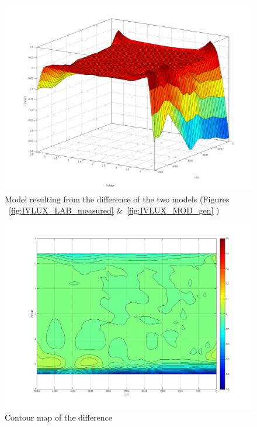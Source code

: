 \begin{figure}[H]
  \begin{center}
	  \includegraphics[width=\textwidth]{images/Diff_Contour}
	  \caption{Model resulting from the difference of the two models (Figures ~\ref{fig:IVLUX_LAB_measured} \&~\ref{fig:IVLUX_MOD_gen} )  }
	  \label{fig:Diff_Contour}
  \end{center}
\end{figure}

\begin{figure}[H]
  \begin{center}
	  \includegraphics[width=\textwidth]{images/Contour_map}
	  \caption{Contour map of the difference}
	  \label{fig:Contour_map}
  \end{center}
\end{figure}

